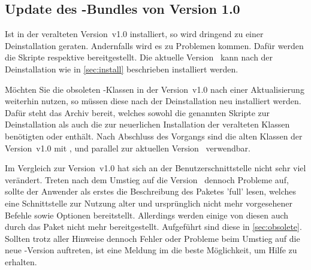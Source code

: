 \subsection{Update des \TUDScript-Bundles von Version 1.0}
\begin{Declaration*}{}
\begin{Declaration*}{}
\begin{Declaration*}{}
%
Ist \TUDScript in der veralteten Version~v1.0 installiert, so wird dringend zu 
einer Deinstallation geraten. Andernfalls wird es zu Problemen kommen. Dafür 
werden die Skripte 
respektive
bereitgestellt. Die aktuelle Version~\vTUDScript{} kann nach der Deinstallation 
wie in \autoref{sec:install} beschrieben installiert werden.

Möchten Sie die obsoleten \TUDScript-Klassen in der Version~v1.0 nach einer 
Aktualisierung weiterhin nutzen, so müssen diese nach der Deinstallation neu 
installiert werden. Dafür steht das Archiv 
%
{} bereit, welches sowohl die genannten 
Skripte zur Deinstallation als auch die zur neuerlichen Installation der 
veralteten Klassen benötigten  oder 
 enthält. Nach Abschluss des Vorgangs sind 
die alten Klassen der Version~v1.0 mit , 
 und  parallel zur aktuellen 
Version~\vTUDScript{} verwendbar.

Im Vergleich zur Version~v1.0 hat sich an der Benutzerschnittstelle nicht sehr 
viel verändert. Treten nach dem Umstieg auf die Version~\vTUDScript{} dennoch 
Probleme auf, sollte der Anwender als erstes die Beschreibung des Paketes 
'full' lesen, welches eine Schnittstelle zur Nutzung alter 
und ursprünglich nicht mehr vorgesehener Befehle sowie Optionen bereitstellt. 
Allerdings werden einige von diesen auch durch das Paket  
nicht mehr bereitgestellt. Aufgeführt sind diese in \autoref{sec:obsolete}. 
Sollten trotz aller Hinweise dennoch Fehler oder Probleme beim Umstieg auf die 
neue \TUDScript-Version auftreten, ist eine Meldung im \Forum die beste 
Möglichkeit, um Hilfe zu erhalten.
\end{Declaration*}
\end{Declaration*}
\end{Declaration*}



